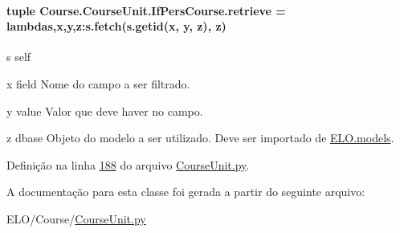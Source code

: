 \paragraph[{retrieve}]{\setlength{\rightskip}{0pt plus 5cm}tuple Course.\+Course\+Unit.\+If\+Pers\+Course.\+retrieve = lambdas,x,y,z\+:s.\+fetch(s.\+getid(x, y, z), z)\hspace{0.3cm}{\ttfamily [static]}}\label{classCourse_1_1CourseUnit_1_1IfPersCourse_ae7dca869bdb9f9db07ce55bf78991aae}
\begin{DoxyItemize}
\item s self\end{DoxyItemize}
\begin{DoxyItemize}
\item x field Nome do campo a ser filtrado.\end{DoxyItemize}
\begin{DoxyItemize}
\item y value Valor que deve haver no campo.\end{DoxyItemize}
\begin{DoxyItemize}
\item z dbase Objeto do modelo a ser utilizado. Deve ser importado de \hyperlink{namespaceELO_1_1models}{E\+L\+O.\+models}. \end{DoxyItemize}


Definição na linha \hyperlink{CourseUnit_8py_source_l00188}{188} do arquivo \hyperlink{CourseUnit_8py_source}{Course\+Unit.\+py}.



A documentação para esta classe foi gerada a partir do seguinte arquivo\+:\begin{DoxyCompactItemize}
\item 
E\+L\+O/\+Course/\hyperlink{CourseUnit_8py}{Course\+Unit.\+py}\end{DoxyCompactItemize}

